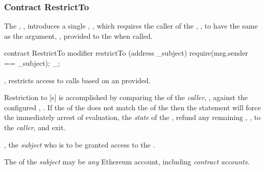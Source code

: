 \subsubsection{Contract RestrictTo}

The , , introduces a single
, , which requires the caller of the
, , to have the same  as the
argument, , provided to the  when called.

\begin{solidity}
contract RestrictTo {
  modifier restrictTo (address _subject) {
    require(msg.sender == _subject);
    _;
  }
}
\end{solidity}

\begin{code}
  \item \operations
  \begin{modifiers}
    \item {}, restricts access to
       calls based on an  provided.

      \begin{displayquote}
        Restriction to [s] is accomplished by comparing the
         of the  \emph{caller}, ,
        against the configured , . If the
         of the  does not match the
         of the  then the  statement
        will force the immediately arrest of  evaluation,
         the \emph{state} of the , refund any
        remaining , , to the \emph{caller}, and
        exit.\footnotemark{}

      \end{displayquote}


      \begin{parameters}
      \item {}, the \emph{subject} who is to be granted
        access to the .

        \begin{displayquote}
          The  of the \emph{subject} may be \emph{any} Ethereum
          account, including \emph{contract accounts}.
        \end{displayquote}
      \end{parameters}
  \end{modifiers}
\end{code}
